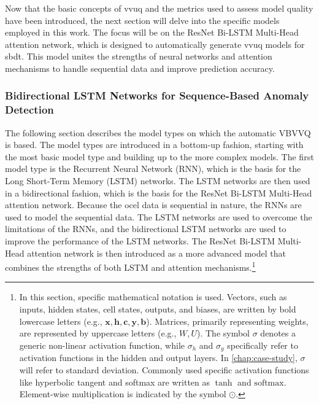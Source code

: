 Now that the basic concepts of \gls{vvuq} and the metrics used to assess model quality have been introduced, the next section will delve into the specific models employed in this work. The focus will be on the ResNet Bi-LSTM Multi-Head attention network, which is designed to automatically generate \gls{vvuq} models for \gls{sbdt}. This model unites the strengths of neural networks and attention mechanisms to handle sequential data and improve prediction accuracy.

\subsubsection*{Bidirectional LSTM Networks for Sequence-Based Anomaly Detection}

The following section describes the model types on which the automatic VBVVQ is based. The model types are introduced in a bottom-up fashion, starting with the most basic model type and building up to the more complex models.
The first model type is the Recurrent Neural Network (RNN), which is the basis for the Long Short-Term Memory (LSTM) networks. The LSTM networks are then used in a bidirectional fashion, which is the basis for the ResNet Bi-LSTM Multi-Head attention network. Because the \gls{ocel} data is sequential in nature, the RNNs are used to model the sequential data. The LSTM networks are used to overcome the limitations of the RNNs, and the bidirectional LSTM networks are used to improve the performance of the LSTM networks. The ResNet Bi-LSTM Multi-Head attention network is then introduced as a more advanced model that combines the strengths of both LSTM and attention mechanisms.\footnote{In this section, specific mathematical notation is used. Vectors, such as inputs, hidden states, cell states, outputs, and biases, are written by bold lowercase letters (e.g., \( \bm{x}, \bm{h}, \bm{c}, \bm{y}, \bm{b} \)). Matrices, primarily representing weights, are represented by uppercase letters (e.g., \( W, U \)). The symbol \( \sigma \) denotes a generic non-linear activation function, while \( \sigma_h \) and \( \sigma_y \) specifically refer to activation functions in the hidden and output layers. In \autoref{chap:case-study}, \( \sigma \) will refer to standard deviation. Commonly used specific activation functions like hyperbolic tangent and softmax are written as \( \tanh \) and \( \text{softmax} \). Element-wise multiplication is indicated by the symbol \( \odot \).}

